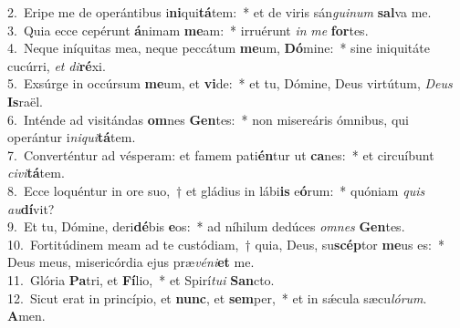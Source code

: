 {2.~}Eripe me de operántibus i\textbf{ni}qui\textbf{tá}tem:~* et de viris sán\textit{gui}\textit{num} \textbf{sal}va me.\\
{3.~}Quia ecce cepérunt \textbf{á}nimam \textbf{me}am:~* irruérunt \textit{in} \textit{me} \textbf{for}tes.\\
{4.~}Neque iníquitas mea, neque peccátum \textbf{me}um, \textbf{Dó}mine:~* sine iniquitáte cucúrri, \textit{et} \textit{di}\textbf{ré}xi.\\
{5.~}Exsúrge in occúrsum \textbf{me}um, et \textbf{vi}de:~* et tu, Dómine, Deus virtútum, \textit{De}\textit{us} \textbf{Is}raël.\\
{6.~}Inténde ad visitándas \textbf{om}nes \textbf{Gen}tes:~* non misereáris ómnibus, qui operántur i\textit{ni}\textit{qui}\textbf{tá}tem.\\
{7.~}Converténtur ad vésperam: et famem pati\textbf{én}tur ut \textbf{ca}nes:~* et circuíbunt \textit{ci}\textit{vi}\textbf{tá}tem.\\
{8.~}Ecce loquéntur in ore suo,~† et gládius in lábi\textbf{is} e\textbf{ó}rum:~* quóniam \textit{quis} \textit{au}\textbf{dí}vit?\\
{9.~}Et tu, Dómine, deri\textbf{dé}bis \textbf{e}os:~* ad níhilum dedúces \textit{om}\textit{nes} \textbf{Gen}tes.\\
{10.~}Fortitúdinem meam ad te custódiam,~† quia, Deus, su\textbf{scép}tor \textbf{me}us es:~* Deus meus, misericórdia ejus præ\textit{vé}\textit{ni}\textbf{et} me.\\
{11.~}Glória \textbf{Pa}tri, et \textbf{Fí}lio,~* et Spirí\textit{tu}\textit{i} \textbf{San}cto.\\
{12.~}Sicut erat in princípio, et \textbf{nunc}, et \textbf{sem}per,~* et in sǽcula sæcu\textit{ló}\textit{rum}. \textbf{A}men.\\
